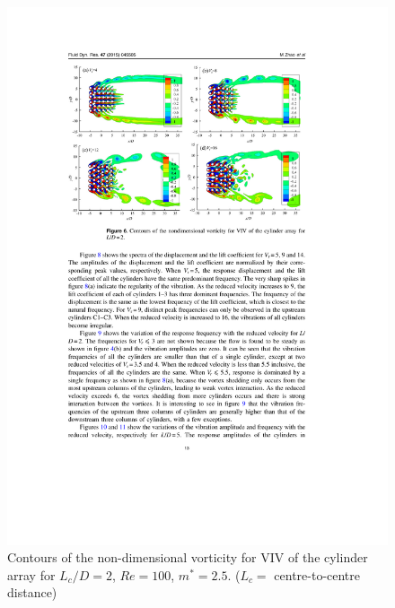 \begin{figure}[tbp]
	\centering
	\captionsetup{justification=centering}
	\includegraphics[width=0.9\linewidth]{Figs/VIVmulticylinderZhao}
	\caption{Contours of the non-dimensional vorticity for VIV of the cylinder array for $ L_c/D=2 $, $ Re=100 $, $ m^*=2.5 $. ($ L_c = $ centre-to-centre distance) \cite{Zhao2015b}}
	\label{fig:vivmulticylinderzhao}
\end{figure}

